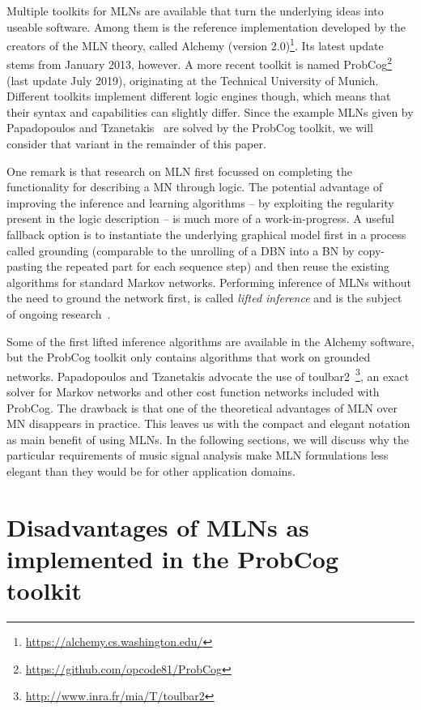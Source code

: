 \documentclass[letterpaper]{article} %
\begin{document}
Multiple toolkits for MLNs are available that turn the underlying ideas into useable software. Among them is the reference implementation developed by the creators of the MLN theory, called Alchemy (version 2.0)\footnote{\url{https://alchemy.cs.washington.edu/}}. Its latest update stems from January 2013, however. A more recent toolkit is named ProbCog\footnote{\url{https://github.com/opcode81/ProbCog}} (last update July 2019), originating at the Technical University of Munich. Different toolkits implement different logic engines though, which means that their syntax and capabilities can slightly differ. Since the example MLNs given by Papadopoulos and Tzanetakis~\cite{papadopoulos2012ismir,papadopoulos2013icassp} are solved by the ProbCog toolkit, we will consider that variant in the remainder of this paper.

One remark is that research on MLN first focussed on completing the functionality for describing a MN through logic. The potential advantage of improving the inference and learning algorithms -- by exploiting the regularity present in the logic description -- is much more of a work-in-progress. A useful fallback option is to instantiate the underlying graphical model first in a process called grounding (comparable to the unrolling of a DBN into a BN by copy-pasting the repeated part for each sequence step) and then reuse the existing algorithms for standard Markov networks. Performing inference of MLNs without the need to ground the network first, is called \emph{lifted inference} and is the subject of ongoing research~\cite{braz2005ijcai,singla2008aaai,gogate2011uai}.

Some of the first lifted inference algorithms are available in the Alchemy software, but the ProbCog toolkit only contains algorithms that work on grounded networks. Papadopoulos and Tzanetakis advocate the use of toulbar2~\footnote{\url{http://www.inra.fr/mia/T/toulbar2}}, an exact solver for Markov networks and other cost function networks included with ProbCog. The drawback is that one of the theoretical advantages of MLN over MN disappears in practice. This leaves us with the compact and elegant notation as main benefit of using MLNs. In the following sections, we will discuss why the particular requirements of music signal analysis make MLN formulations less elegant than they would be for other application domains.


\section{Disadvantages of MLNs as implemented in the ProbCog toolkit}
\end{document}
